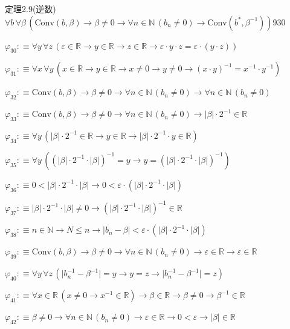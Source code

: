 \begin{fullproof}{定理2.9(逆数)}{$\forall b\,\forall \beta\,(\mathrm{Conv}(b,\beta) \to \beta \neq 0 \to \forall n \in \mathbb{N}\,(b_{n} \neq 0) \to \mathrm{Conv}(b^{\ast},\beta^{-1}))$}{930}
\begin{abbrevlist}
\item $\varphi_{30} :\equiv \forall y\,\forall z\,(\varepsilon \in \mathbb{R} \to y \in \mathbb{R} \to z \in \mathbb{R} \to \varepsilon \cdot y \cdot z = \varepsilon \cdot (y \cdot z))$
\item $\varphi_{31} :\equiv \forall x\,\forall y\,(x \in \mathbb{R} \to y \in \mathbb{R} \to x \neq 0 \to y \neq 0 \to (x \cdot y)^{-1} = x^{-1} \cdot y^{-1})$
\item $\varphi_{32} :\equiv \mathrm{Conv}(b,\beta) \to \beta \neq 0 \to \forall n \in \mathbb{N}\,(b_{n} \neq 0) \to \forall n \in \mathbb{N}\,(b_{n} \neq 0)$
\item $\varphi_{33} :\equiv \mathrm{Conv}(b,\beta) \to \beta \neq 0 \to \forall n \in \mathbb{N}\,(b_{n} \neq 0) \to \lvert \beta \rvert \cdot 2^{-1} \in \mathbb{R}$
\item $\varphi_{34} :\equiv \forall y\,(\lvert \beta \rvert \cdot 2^{-1} \in \mathbb{R} \to y \in \mathbb{R} \to \lvert \beta \rvert \cdot 2^{-1} \cdot y \in \mathbb{R})$
\item $\varphi_{35} :\equiv \forall y\,((\lvert \beta \rvert \cdot 2^{-1} \cdot \lvert \beta \rvert)^{-1} = y \to y = (\lvert \beta \rvert \cdot 2^{-1} \cdot \lvert \beta \rvert)^{-1})$
\item $\varphi_{36} :\equiv 0 < \lvert \beta \rvert \cdot 2^{-1} \cdot \lvert \beta \rvert \to 0 < \varepsilon \cdot (\lvert \beta \rvert \cdot 2^{-1} \cdot \lvert \beta \rvert)$
\item $\varphi_{37} :\equiv \lvert \beta \rvert \cdot 2^{-1} \cdot \lvert \beta \rvert \neq 0 \to (\lvert \beta \rvert \cdot 2^{-1} \cdot \lvert \beta \rvert)^{-1} \in \mathbb{R}$
\item $\varphi_{38} :\equiv n \in \mathbb{N} \to N \leq n \to \lvert b_{n} - \beta \rvert < \varepsilon \cdot (\lvert \beta \rvert \cdot 2^{-1} \cdot \lvert \beta \rvert)$
\item $\varphi_{39} :\equiv \mathrm{Conv}(b,\beta) \to \beta \neq 0 \to \forall n \in \mathbb{N}\,(b_{n} \neq 0) \to \varepsilon \in \mathbb{R} \to \varepsilon \in \mathbb{R}$
\item $\varphi_{40} :\equiv \forall y\,\forall z\,(\lvert b_{n}^{-1} - \beta^{-1} \rvert = y \to y = z \to \lvert b_{n}^{-1} - \beta^{-1} \rvert = z)$
\item $\varphi_{41} :\equiv \forall x \in \mathbb{R}\,(x \neq 0 \to x^{-1} \in \mathbb{R}) \to \beta \in \mathbb{R} \to \beta \neq 0 \to \beta^{-1} \in \mathbb{R}$
\item $\varphi_{42} :\equiv \beta \neq 0 \to \forall n \in \mathbb{N}\,(b_{n} \neq 0) \to \varepsilon \in \mathbb{R} \to 0 < \varepsilon \to \lvert \beta \rvert \in \mathbb{R}$

\end{abbrevlist}
\end{fullproof}
